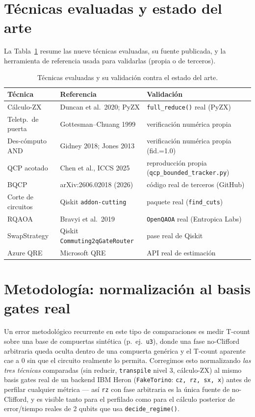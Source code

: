 \documentclass[9pt,twocolumn]{extarticle}
\begin{document}
\section{Técnicas evaluadas y estado del arte}
La Tabla~\ref{tab:sota} resume las nueve técnicas evaluadas, su fuente
publicada, y la herramienta de referencia usada para validarlas (propia o de
terceros).

\begin{table}[t]
\centering
\footnotesize
\caption{Técnicas evaluadas y su validación contra el estado del arte.}
\label{tab:sota}
\begin{tabular}{p{1.55cm}p{2.5cm}p{3.4cm}}
\toprule
\textbf{Técnica} & \textbf{Referencia} & \textbf{Validación} \\
\midrule
Cálculo-ZX & Duncan et al.\ 2020; PyZX & \texttt{full\_reduce()} real (PyZX) \\
Teletp.\ de puerta & Gottesman--Chuang 1999 & verificación numérica propia \\
Des-cómputo AND & Gidney 2018; Jones 2013 & verificación numérica propia (fid.=1.0) \\
QCP acotado & Chen et al., ICCS 2025 & reproducción propia (\texttt{qcp\_bounded\_tracker.py}) \\
BQCP & arXiv:2606.02018 (2026) & código real de terceros (GitHub) \\
Corte de circuitos & Qiskit \texttt{addon-cutting} & paquete real (\texttt{find\_cuts}) \\
RQAOA & Bravyi et al.\ 2019 & \texttt{OpenQAOA} real (Entropica Labs) \\
SwapStrategy & Qiskit \texttt{Commuting2qGate\allowbreak Router} & pase real de Qiskit \\
Azure QRE & Microsoft QRE & API real de estimación \\
\bottomrule
\end{tabular}
\end{table}

\section{Metodología: normalización al basis gates real}
Un error metodológico recurrente en este tipo de comparaciones es medir
T-count sobre una base de compuertas sintética (p.\ ej.\ \texttt{u3}), donde
una fase no-Clifford arbitraria queda oculta dentro de una compuerta genérica
y el T-count aparente cae a 0 sin que el circuito realmente lo permita.
Corregimos esto normalizando \emph{las tres técnicas} comparadas (sin
reducir, \texttt{transpile} nivel 3, cálculo-ZX) al mismo basis gates real de
un backend IBM Heron (\texttt{FakeTorino}: \texttt{cz, rz, sx, x}) antes de
perfilar cualquier métrica --- así \texttt{rz} con fase arbitraria es la
única fuente de no-Clifford, y es visible tanto para el perfilado como para
el cálculo posterior de error/tiempo reales de 2 qubits que usa
\texttt{decide\_regime()}.
\end{document}
